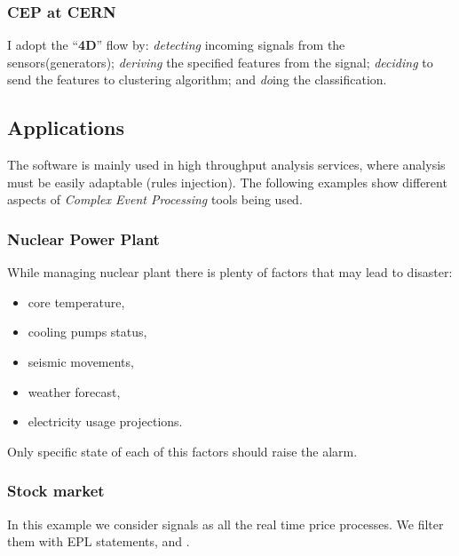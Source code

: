 \documentclass[11pt, letterpaper]{article}            %
\begin{document}
\subsubsection{CEP at CERN}
I adopt the ``\textbf{4D}'' flow by: \emph{detecting} incoming signals from the sensors(generators); \emph{deriving} the specified features from the signal; \emph{deciding} to send the features to clustering algorithm; and \emph{do}ing the classification.

\subsection{Applications}
The software is mainly used in high throughput analysis services, where analysis must be easily adaptable (rules injection). The following examples show different aspects of \emph{Complex Event Processing} tools being used.
\subsubsection{Nuclear Power Plant}
While managing nuclear plant there is plenty of factors that may lead to disaster:
\begin{itemize}
\item core temperature,
\item cooling pumps status,
\item seismic movements,
\item weather forecast,
\item electricity usage projections.
\end{itemize}
Only specific state of each of this factors should raise the alarm.
\subsubsection{Stock market}
In this example we consider signals as all the real time price processes. We filter them with EPL statements, and .
\end{document}
